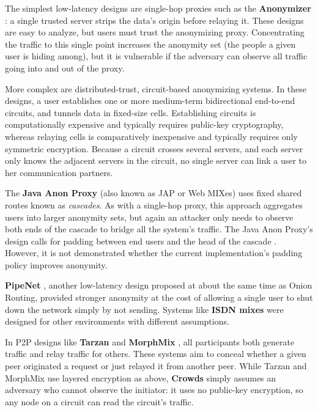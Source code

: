 \documentclass[times,10pt,twocolumn]{article}
\begin{document}
The simplest low-latency designs are single-hop proxies such as the
{\bf Anonymizer} \cite{anonymizer}: a single trusted server strips the
data's origin before relaying it.  These designs are easy to
analyze, but users must trust the anonymizing proxy.
Concentrating the traffic to this single point increases the anonymity set
(the people a given user is hiding among), but it is vulnerable if the
adversary can observe all traffic going into and out of the proxy.

More complex are distributed-trust, circuit-based anonymizing systems.
In these designs, a user establishes one or more medium-term bidirectional
end-to-end circuits, and tunnels data in fixed-size cells.
Establishing circuits is computationally expensive and typically
requires public-key
cryptography, whereas relaying cells is comparatively inexpensive and
typically requires only symmetric encryption.
Because a circuit crosses several servers, and each server only knows
the adjacent servers in the circuit, no single server can link a
user to her communication partners.

The {\bf Java Anon Proxy} (also known as JAP or Web MIXes) uses fixed shared
routes known as \emph{cascades}.  As with a single-hop proxy, this
approach aggregates users into larger anonymity sets, but again an
attacker only needs to observe both ends of the cascade to bridge all
the system's traffic.  The Java Anon Proxy's design
calls for padding between end users and the head of the cascade
\cite{web-mix}. However, it is not demonstrated whether the current
implementation's padding policy improves anonymity.

{\bf PipeNet} \cite{back01, pipenet}, another low-latency design proposed at
about the same time as Onion Routing, provided
stronger anonymity at the cost of allowing a single user to shut
down the network simply by not sending. Systems like {\bf ISDN mixes}
\cite{isdn-mixes} were designed for other environments with
different assumptions.

In P2P designs like {\bf Tarzan} \cite{tarzan:ccs02} and {\bf MorphMix}
\cite{morphmix:fc04}, all participants both generate traffic and relay
traffic for others. These systems aim to conceal
whether a given peer originated a request
or just relayed it from another peer. While Tarzan and MorphMix use
layered encryption as above, {\bf Crowds} \cite{crowds-tissec} simply assumes
an adversary who cannot observe the initiator: it uses no public-key
encryption, so any node on a circuit can read the circuit's traffic.
\end{document}
